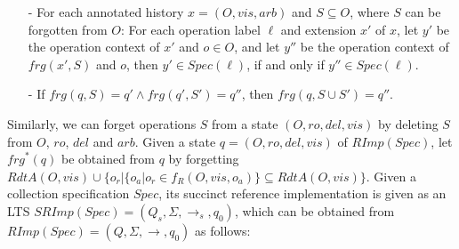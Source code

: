 \begin{itemize}
\setlength{\itemsep}{0.5pt}
\item[-] For each annotated history $x = (O,\mathit{vis},\mathit{arb})$ and $S \subseteq O$, where $S$ can be forgotten from $O$: For each operation label $\ell$ and extension $x'$ of $x$, let $y'$ be the operation context of $x'$ and $o \in O$, and let $y''$ be the operation context of $frg(x',S)$ and $o$, then $y' \in Spec(\ell)$, if and only if $y'' \in Spec(\ell)$.



\item[-] If $\mathit{frg}(q,S) = q' \wedge \mathit{frg}(q',S') = q''$, then $\mathit{frg}(q,S \cup S') =q''$.
\end{itemize} 


Similarly, we can forget operations $S$ from a state $(O,\mathit{ro},\mathit{del},\mathit{vis})$ by deleting $S$ from $O$, $\mathit{ro}$, $\mathit{del}$ and $\mathit{arb}$. {\color {red}Given a state $q = (O,\mathit{ro},\mathit{del},\mathit{vis})$ of $\mathit{RImp}(\mathit{Spec})$, let $\mathit{frg}^*(q)$ be obtained from $q$ by forgetting} $\mathit{RdtA}(O,\mathit{vis}) \cup \{ o_r \vert  \{ o_a \vert o_r \in f_R(O,\mathit{vis},o_a) \} \subseteq \mathit{RdtA}(O,\mathit{vis}) \}$. Given a collection specification $\mathit{Spec}$, its succinct reference implementation is given as an LTS $\mathit{SRImp}(\mathit{Spec}) = (Q_s,\Sigma,\rightarrow_s,q_0)$, which can be obtained from $\mathit{RImp}(\mathit{Spec}) = (Q,\Sigma,\rightarrow,q_0)$ as follows:

